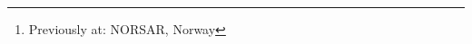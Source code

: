 \author{
Hom Nath Gharti\footnote{Previously at: NORSAR, Norway}, Princeton University, USA \\
Dimitri Komatitsch, CNRS/University of Aix-Marseille, France\\
Volker Oye, NORSAR, Norway \\
Roland Martin, University of Toulouse, France \\
Jeroen Tromp, Princeton University, USA \\
Zhenzhen Yan, Institute of Remote Sensing and Digital Earth, CAS, China
}
